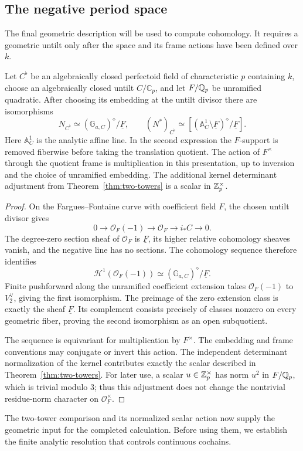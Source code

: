 \subsection{The negative period space}

The final geometric description will be used to compute cohomology.
It requires a geometric untilt only after the space and its frame
actions have been defined over $k$.

\begin{lemma}
\label{lem:negative-presentation}
Let $C^\flat$ be an algebraically closed perfectoid field of
characteristic $p$ containing $k$, choose an algebraically closed
untilt $C/\mathbb C_p$, and let $F/\mathbb Q_p$ be unramified quadratic.
After choosing its embedding at the untilt divisor there are
isomorphisms
\begin{equation}
 N_{C^\flat}\simeq
       (\mathbb G_{a,C})^\diamond/\underline F,
 \qquad
 (N^*)_{C^\flat}\simeq
       [ (\mathbb A^1_C\setminus\underline F)^\diamond/
          \underline F].
 \label{eq:negative-presentation}
\end{equation}
Here $\mathbb A^1_C$ is the analytic affine line.  In the second
expression the $F$-support is removed fiberwise
before taking the translation quotient.  The action of
$F^\times$ through the quotient frame is multiplication in this
presentation, up to inversion and the choice of unramified
embedding.  The additional kernel determinant adjustment
from Theorem~\ref{thm:two-towers} is a scalar in $\mathbb Z_p^\times$.
\end{lemma}

\begin{proof}
On the Fargues--Fontaine curve with coefficient field $F$,
the chosen untilt divisor gives \citep[Proposition~II.2.3]{FS21}
\[
 0\longrightarrow\mathcal O_F(-1)
  \longrightarrow\mathcal O_F
  \longrightarrow i_*C\longrightarrow0.
\]
The degree-zero section sheaf of $\mathcal O_F$ is
$\underline F$, its higher relative cohomology sheaves vanish,
and the negative line has no sections.  The cohomology sequence
therefore identifies
\[
 \mathcal H^1(\mathcal O_F(-1))
       \simeq (\mathbb G_{a,C})^\diamond/\underline F.
\]
Finite pushforward along the unramified coefficient extension
takes $\mathcal O_F(-1)$ to $V_2^\vee$, giving the first
isomorphism.  The preimage of the zero extension class is
exactly the sheaf $\underline F$.  Its complement consists
precisely of classes nonzero on every geometric fiber, proving
the second isomorphism as an open subquotient.

The sequence is equivariant for multiplication by $F^\times$.
The embedding and frame conventions may conjugate or invert
this action.  The independent determinant normalization of
the kernel contributes exactly the scalar described in
Theorem~\ref{thm:two-towers}.  For later use, a scalar
$u\in\mathbb Z_p^\times$ has norm $u^2$ in $F/\mathbb Q_p$, which is
trivial modulo $3$; thus this adjustment does not change the
nontrivial residue-norm character on $\mathcal O_F^\times$.
\end{proof}

The two-tower comparison and its normalized scalar action now supply the
geometric input for the completed calculation. Before using them, we
establish the finite analytic resolution that controls continuous cochains.
